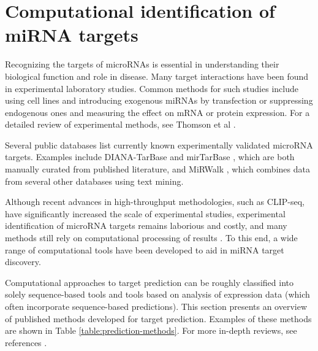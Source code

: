 
\section{Computational identification of miRNA targets}




Recognizing the targets of microRNAs is essential in understanding their
biological function and role in disease. Many target
interactions have been found in experimental laboratory studies. Common
methods for such studies include using cell lines and introducing exogenous
miRNAs by transfection or suppressing endogenous ones and measuring the
effect on mRNA or protein expression. For a detailed review of experimental
methods, see Thomson et al \citep{Thomson2011}.

Several public databases list currently known experimentally validated
microRNA targets. Examples include DIANA-TarBase \citep{Vlachos2015} and
mirTarBase \citep{Chou2016}, which are both manually curated from published
literature, and MiRWalk \citep{Dweep2015}, which combines data from several
other databases using text mining.

Although recent advances in high-throughput methodologies, such as CLIP-seq,
have significantly increased the scale of experimental studies, experimental
identification of microRNA targets remains laborious and costly, and many
methods still rely on computational processing of results \citep{Vlachos2015}. To
this end, a wide range of computational tools have been developed to aid in
miRNA target discovery.

Computational approaches to target prediction can be roughly classified into
solely sequence-based tools and tools based on analysis of expression data
(which often incorporate sequence-based predictions). This section presents an
overview of published methods developed for target prediction.
Examples of these methods are shown in Table \ref{table:prediction-methods}.
For more in-depth reviews, see references \citep{Yue2009,Muniategui2013}.


